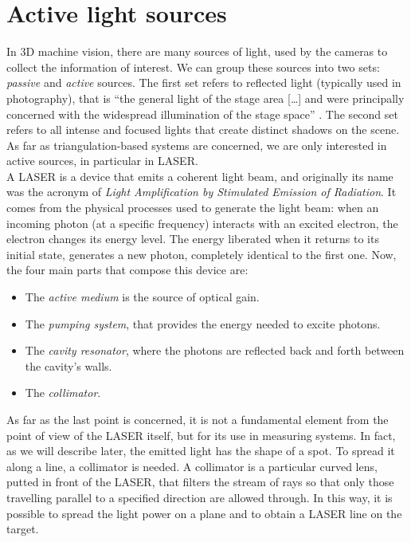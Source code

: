 \section{Active light sources}
In 3D machine vision, there are many sources of light, used by the cameras to collect the information of interest. We can group these sources into two sets: \textit{passive} and \textit{active} sources. The first set refers to reflected light (typically used in photography), that is ``the general light of the stage area [\ldots] and were principally concerned with the widespread illumination of the stage space'' \cite{palmer2013light}. The second set refers to all intense and focused lights that create distinct shadows on the scene.
As far as triangulation-based systems are concerned, we are only interested in active sources, in particular in \acs{LASER}. \\

A \acs{LASER} is a device that emits a coherent light beam, and originally its name was the acronym of \textit{Light Amplification by Stimulated Emission of Radiation}. It comes from the physical processes used to generate the light beam: when an incoming photon (at a specific frequency) interacts with an excited electron, the electron changes its energy level. The energy liberated when it returns to its initial state, generates a new photon, completely identical to the first one. Now, the four main parts that compose this device are:
  \begin{itemize}
    \item The \textit{active medium} is the source of optical gain.
    \item The \textit{pumping system}, that provides the energy needed to excite photons.
    \item The \textit{cavity resonator}, where the photons are reflected back and forth between the cavity's walls.
    \item The \textit{collimator}.
  \end{itemize}
As far as the last point is concerned, it is not a fundamental element from the point of view of the \acs{LASER} itself, but for its use in measuring systems. In fact, as we will describe later, the emitted light has the shape of a spot. To spread it along a line, a collimator is needed. A collimator is a particular curved lens, putted in front of the \acs{LASER}, that filters the stream of rays so that only those travelling parallel to a specified direction are allowed through. In this way, it is possible to spread the light power on a plane and to obtain a \acs{LASER} line on the target.\\

